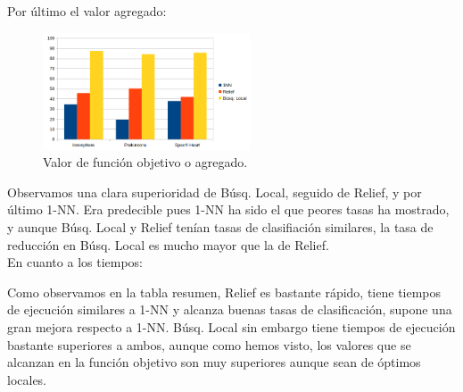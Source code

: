 \documentclass[11pt,a4paper]{article}
\theoremstyle{definition}
\begin{document}
	Por último el valor agregado:
	
	\begin{figure}[H]
		\centering
		\includegraphics[width=0.55\textwidth]{images/agr.png}
		\caption{Valor de función objetivo o agregado.}
	\end{figure}
	
	Observamos una clara superioridad de Búsq. Local, seguido de Relief, y por último 1-NN. Era predecible pues 1-NN ha sido el que peores tasas ha mostrado, y aunque Búsq. Local y Relief tenían tasas de clasifiación similares, la tasa de reducción en Búsq. Local es mucho mayor que la de Relief.\\
	
	En cuanto a los tiempos:
	
		Como observamos en la tabla resumen, Relief es bastante rápido, tiene tiempos de ejecución similares a 1-NN y alcanza buenas tasas de clasificación, supone una gran mejora respecto a 1-NN. Búsq. Local sin embargo tiene tiempos de ejecución bastante superiores a ambos, aunque como hemos visto, los valores que se alcanzan en la función objetivo son muy superiores aunque sean de óptimos locales.
	
\end{document}

